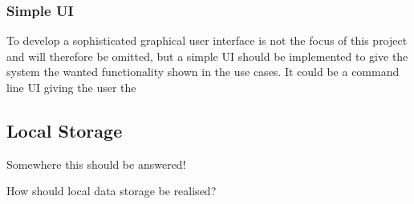\subsubsection*{Simple UI}
To develop a sophisticated graphical user interface is not the focus of this project and will therefore be omitted, but a simple UI should be implemented to give the system the wanted functionality shown in the use cases.
It could be a command line UI giving the user the 

\subsection{Local Storage}
Somewhere this should be answered!

How should local data storage be realised?

	


